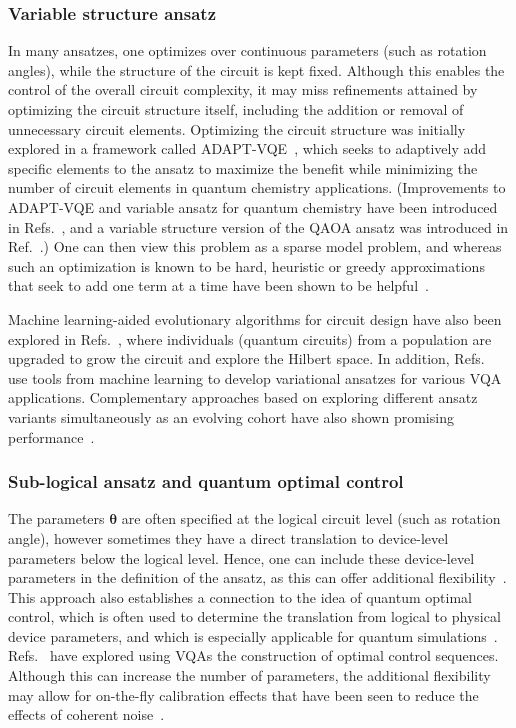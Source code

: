\documentclass[prx,twocolumn,floatfix,superscriptaddress,longbibliography]{revtex4-1}
\renewcommand{\vec}[1]{\boldsymbol{#1}}  %
\newcommand{\<}{\langle}
\renewcommand{\>}{\rangle}
\renewcommand{\vec}[1]{\boldsymbol{#1}}  %
\begin{document}
\subsubsection{Variable structure ansatz} In many ansatzes,  one optimizes over continuous parameters (such as rotation angles), while the structure of the circuit is kept fixed.  Although this enables the control of the overall circuit complexity, it may miss refinements attained by optimizing the circuit structure itself, including the addition or removal of unnecessary circuit elements. Optimizing the circuit structure was initially explored in a framework called ADAPT-VQE~\cite{grimsley2019adaptive}, which seeks to adaptively add specific elements to the ansatz to maximize the benefit while minimizing the number of circuit elements in quantum chemistry applications. (Improvements to ADAPT-VQE and variable ansatz for quantum chemistry have been introduced in Refs.~\cite{tang2019qubit,yordanov2020iterative}, and a variable structure version of the QAOA ansatz was introduced in Ref.~\cite{zhu2020adaptive}.) One can then view this problem as a sparse model problem, and whereas such an   optimization  is known to be hard, heuristic or greedy approximations that seek to add one term at a time have been shown to be helpful~\cite{grimsley2019adaptive,tang2019qubit}. 

Machine learning-aided evolutionary algorithms for circuit design have also been explored  in Refs.~\cite{rattew2019domain,chivilikhin2020mog}, where individuals (quantum circuits) from a population are upgraded to grow the circuit and explore the Hilbert space. In addition, Refs.~\cite{cincio2021machine,cincio2018learning,du2020quantum,zhang2020differentiable,bilkis2021semi} use tools from machine learning to develop variational ansatzes for various VQA applications. Complementary approaches based on exploring different ansatz variants simultaneously as an evolving cohort have also shown promising performance~\cite{rattew2020evoansatz}.

\subsubsection{Sub-logical ansatz and quantum optimal control} The parameters $\vec{\theta}$ are often specified at the logical circuit level (such as rotation angle), however sometimes they have a direct translation to device-level parameters below the logical level. Hence, one can include these device-level parameters in the definition of the ansatz, as this can offer additional flexibility~\cite{Yang2017optimizing}. This approach also establishes a connection to the idea of quantum optimal control, which is often used to determine the translation from logical to physical device parameters, and which is especially applicable for quantum simulations~\cite{magann2020pulses,choquette2020quantum}.  Refs.~\cite{Li2017hybrid,Lu2017} have explored using VQAs the construction of optimal control sequences. Although this can increase the number of parameters, the additional flexibility may allow for on-the-fly calibration effects that have been seen to reduce the effects of coherent noise~\cite{o2016scalable,Li2017hybrid,Lu2017}.
\end{document}

